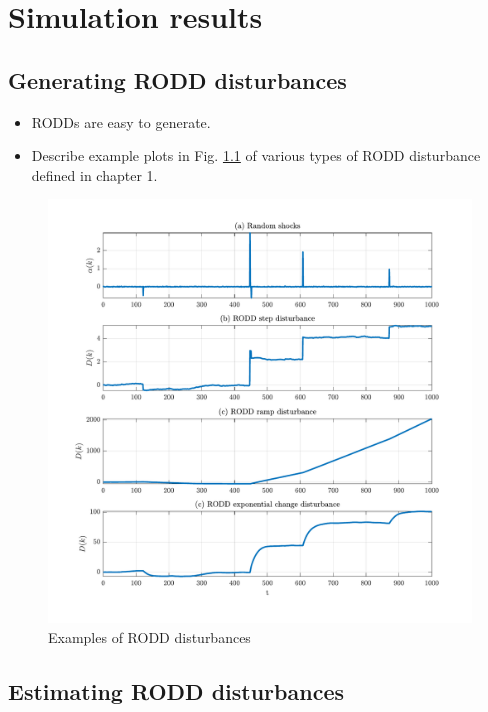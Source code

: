 \chapter{Simulation results}
\label{chap-simulation}

\section{Generating RODD disturbances}

\begin{itemize}
	\item RODDs are easy to generate.
	\item Describe example plots in Fig. \ref{fig:rodd-sim-plots} of various types of RODD disturbance defined in chapter 1.
\end{itemize}

\begin{figure}[htp]
	\centering
	\includegraphics[width=15cm]{images/rodd-sim-plots.pdf}
	\caption{Examples of RODD disturbances}
	\label{fig:rodd-sim-plots}
\end{figure}


\section{Estimating RODD disturbances}

